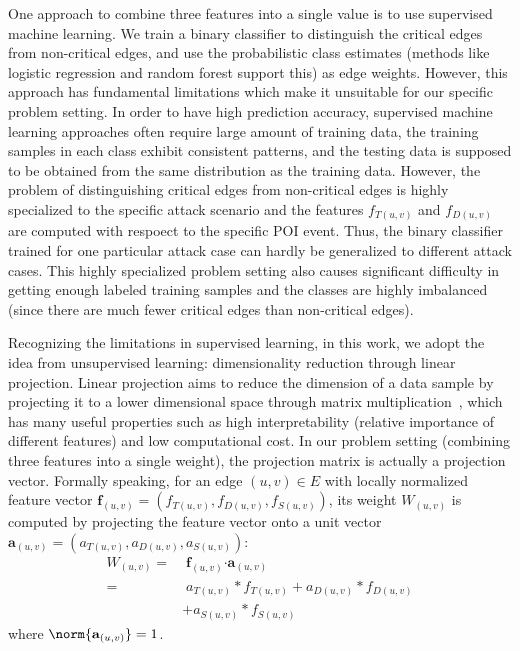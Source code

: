 One approach to combine three features into a single value is to use supervised machine learning. We train a binary classifier to distinguish the critical edges from non-critical edges, and use the probabilistic class estimates (methods like logistic regression and random forest support this) as edge weights. 
However, this approach has fundamental limitations which make it unsuitable for our specific problem setting. 
In order to have high prediction accuracy, supervised machine learning approaches often require large amount of training data, the training samples in each class exhibit consistent patterns, and the testing data is supposed to be obtained from the same distribution as the training data.
However, the problem of distinguishing critical edges from non-critical edges is highly specialized to the specific attack scenario and the features $f_{T(u, v)}$ and $f_{D(u, v)}$ are computed with respoect to the specific POI event. Thus, the binary classifier trained for one particular attack case can hardly be generalized to different attack cases. This highly specialized problem setting also causes significant difficulty in getting enough labeled training samples and the classes are highly imbalanced (since there are much fewer critical edges than non-critical edges).

Recognizing the limitations in supervised learning, in this work, we adopt the idea from unsupervised learning: dimensionality reduction through linear projection. 
Linear projection aims to reduce the dimension of a data sample by projecting it to a lower dimensional space through matrix multiplication~, which has many useful properties such as high interpretability (\ie relative importance of different features) and low computational cost.
In our problem setting (combining three features into a single weight), the projection matrix is actually a projection vector. 
Formally speaking, for an edge $(u, v) \in E$ with locally normalized feature vector $\mathbf{f}_{(u, v)} = (f_{T(u,v)}, f_{D(u, v)}, f_{S(u, v)})$, its weight $W_{(u, v)}$ is computed by projecting the feature vector onto a unit vector $\mathbf{a}_{(u, v)} = (a_{T(u, v)}, a_{D(u, v)}, a_{S(u, v)})$:
\begin{align}
    W_{(u, v)}   = &\; \mathbf{f}_{(u, v)} \boldsymbol{\cdot} \mathbf{a}_{(u, v)} \nonumber \\
                 = &\; a_{T(u, v)} * f_{T(u, v)} + a_{D(u, v)} * f_{D(u, v)} \nonumber \\
                & + a_{S(u, v)} * f_{S(u, v)}\label{eq:projection}
\end{align}
where $\norm{\mathbf{a}_{(u, v)}} = 1$.

